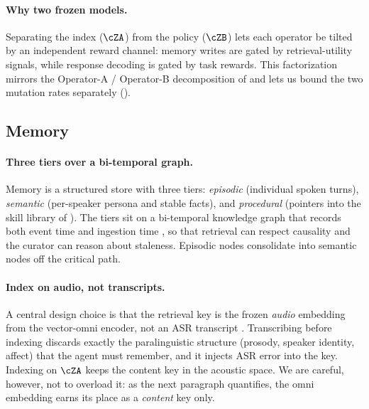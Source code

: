 \paragraph{Why two frozen models.} Separating the index ($\cZA$) from the policy ($\cZB$) lets each operator be tilted by an independent reward channel: memory writes are gated by retrieval-utility signals, while response decoding is gated by task rewards. This factorization mirrors the Operator-A / Operator-B decomposition of  and lets us bound the two mutation rates separately ().

\subsection{Memory}
\label{subsec:memory}

\paragraph{Three tiers over a bi-temporal graph.} Memory is a structured store with three tiers: \emph{episodic} (individual spoken turns), \emph{semantic} (per-speaker persona and stable facts), and \emph{procedural} (pointers into the skill library of ). The tiers sit on a bi-temporal knowledge graph that records both event time and ingestion time \citep{arigraph2024,zep2025,amem2025}, so that retrieval can respect causality and the curator can reason about staleness. Episodic nodes consolidate into semantic nodes off the critical path.

\paragraph{Index on audio, not transcripts.} A central design choice is that the retrieval key is the frozen \emph{audio} embedding from the vector-omni encoder, not an ASR transcript \citep{wavrag2025,voxrag2025}. Transcribing before indexing discards exactly the paralinguistic structure (prosody, speaker identity, affect) that the agent must remember, and it injects ASR error into the key. Indexing on $\cZA$ keeps the content key in the acoustic space. We are careful, however, not to overload it: as the next paragraph quantifies, the omni embedding earns its place as a \emph{content} key only.

